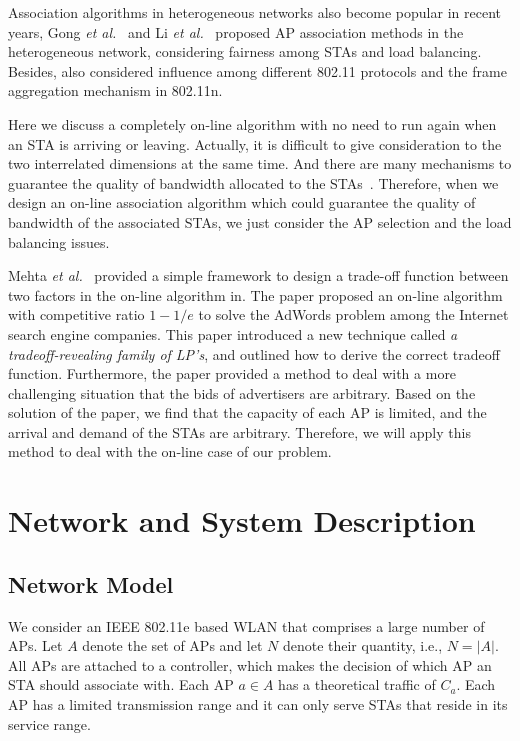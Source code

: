 \documentclass[conference]{IEEEtran}
\begin{document}
  Association algorithms in heterogeneous networks also become popular in recent years, Gong \textit{et al.}~\cite{gong2012ap} and Li \textit{et al.}~\cite{li2012optimal} proposed AP association methods in the heterogeneous network, considering fairness among STAs and load balancing. Besides, \cite{gong2012ap} also considered influence among different 802.11 protocols and the frame aggregation mechanism in 802.11n.

  Here we discuss a completely on-line algorithm with no need to run again when an STA is arriving or leaving.  Actually, it is difficult to give consideration to the two interrelated dimensions at the same time.  And there are many mechanisms to guarantee the quality of bandwidth allocated to the STAs~\cite{Ni:2004}.  Therefore, when we design an on-line association algorithm which could guarantee the quality of bandwidth of the associated STAs, we just consider the AP selection and the load balancing issues.

  Mehta \textit{et al.}~\cite{Mehta:2007} provided a simple framework to design a trade-off function between two factors in the on-line algorithm in.  The paper proposed an on-line algorithm with competitive ratio $1-1/e$ to solve the AdWords problem among the Internet search engine companies.  This paper introduced a new technique called \textit{a tradeoff-revealing family of LP's}, and outlined how to derive the correct tradeoff function.  Furthermore, the paper provided a method to deal with a more challenging situation that the bids of advertisers are arbitrary.  Based on the solution of the paper, we find that the capacity of each AP is limited, and the arrival and demand of the STAs are arbitrary. Therefore, we will apply this method to deal with the on-line case of our problem.


  \section{Network and System Description}\label{sec:network_system}
  \subsection{Network Model}
  We consider an IEEE 802.11e based WLAN that comprises a large number of APs.  Let $A$ denote the set of APs and let $N$ denote their quantity, i.e., $N=|A|$.  All APs are attached to a controller, which makes the decision of which AP an STA should associate with.  Each AP $a\in A$ has a theoretical traffic of $C_a$.  Each AP has a limited transmission range and it can only serve STAs that reside in its service range.
\end{document}
